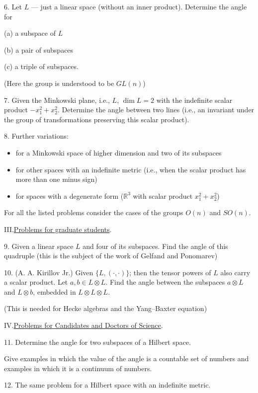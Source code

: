 6. Let \(L\) — just a linear space (without an inner product). Determine the angle for

(a) a subspace of \(L\)

(b) a pair of subspaces

(c) a triple of subspaces.

(Here the group is understood to be \(GL(n)\))

7. Given the Minkowski plane, i.e., \(L\), \(\dim L=2\)
with the indefinite scalar product \(-x_1^2+x_2^2\).
Determine the angle between two lines (i.e., an invariant under the group of transformations preserving this scalar product).

8. Further variations:
\begin{itemize}
\item[—] for a Minkowski space of higher dimension and two of its subspaces
\item[—] for other spaces with an indefinite metric (i.e., when the scalar product has more than one minus sign)
\item[—] for spaces with a degenerate form (\(\mathbb R^3\) with scalar product \(x_1^2+x_2^2\))
\end{itemize}

For all the listed problems consider the cases of the groups \(O(n)\) and \(SO(n)\).

\par\noindent III.\quad\uline{Problems for graduate students}.

9. Given a linear space \(L\) and four of its subspaces.
Find the angle of this quadruple (this is the subject of the work of Gelfand and Ponomarev)

10. (A. A. Kirillov Jr.) Given \(\{L,(\cdot,\cdot)\}\);
then the tensor powers of \(L\) also carry a scalar product. Let \(a,b\in L\otimes L\).
Find the angle between the subspaces \(a\otimes L\) and \(L\otimes b\),
embedded in \(L\otimes L\otimes L\).

(This is needed for Hecke algebras and the Yang–Baxter equation)


\noindent IV.\quad\uline{Problems for Candidates and Doctors of Science}.

11. Determine the angle for two subspaces of a Hilbert space.

Give examples in which the value of the angle is a countable set of numbers and examples in which it is a continuum of numbers.

12. The same problem for a Hilbert space with an indefinite metric.

